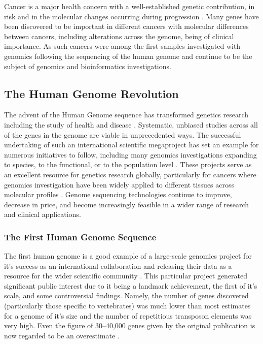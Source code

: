 Cancer is a major health concern with a well-established genetic contribution, in risk and in the molecular changes occurring during progression \citep{Stratton2009}. Many genes have been discovered to be important in different cancers with molecular differences between cancers, including alterations across the genome, being of clinical importance. As such cancers were among the first samples investigated with \gls{genomics} following the sequencing of the human genome \citet{Dickson1999} and continue to be the subject of \gls{genomics} and \gls{bioinformatics} investigations.

\subsection{The Human Genome Revolution}
The advent of the Human Genome sequence \citep{Lander2001} has transformed genetics research including the study of health and disease \citep{Peltonen2001, Lander2011}. Systematic, unbiased studies across all of the genes in the genome are viable in unprecedented ways. The successful undertaking of such an international scientific megaproject has set an example for numerous initiatives to follow, including many \gls{genomics} investigations expanding to species, to the functional, or to the population level \citep{Collins2003}. These projects serve as an excellent resource for genetics research globally, particularly for cancers where \gls{genomics} investigation have been widely applied to different tissues across molecular profiles \citet{Bamford2004, ICGC2011, TCGA2013PAN} . Genome sequencing technologies continue to improve, decrease in price, and become increasingly feasible in a wider range of research and clinical applications.

\subsubsection{The First Human Genome Sequence}
The first human genome is a good example of a large-scale \gls{genomics} project for it's success as an international collaboration and releasing their data as a resource for the wider scientific community \citep{Lander2001, Collins2003}. This particular project generated significant public interest due to it being a landmark achievement, the first of it's scale, and some controversial findings. Namely, the number of genes discovered (particularly those specific to vertebrates) was much lower than most estimates for a genome of it's size and the number of repetitious transposon elements was very high. Even the figure of 30--40,000 genes given by the original publication is now regarded to be an overestimate \citep{IHGSC2004, Ezkurdia2014}. 

